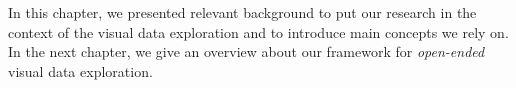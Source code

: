 In this chapter, we presented relevant background to put our research in the context of the visual data exploration and to introduce main concepts we rely on.
In the next chapter, we give an overview about our framework for \emph{open-ended} visual data exploration.